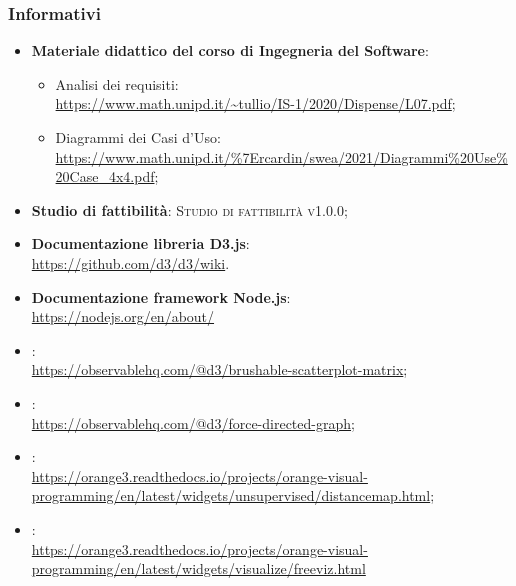 \documentclass[../analisi_dei_requisiti.tex]{subfiles}
\begin{document}
\subsubsection{Informativi}%
\label{ssub:informativi}
\begin{itemize}
  \item \textbf{Materiale didattico del corso di Ingegneria del Software}:
        \begin{itemize}
          \item Analisi dei requisiti: \\
                \url{https://www.math.unipd.it/~tullio/IS-1/2020/Dispense/L07.pdf};
          \item Diagrammi dei Casi d'Uso: \\
                \url{https://www.math.unipd.it/%7Ercardin/swea/2021/Diagrammi%20Use%20Case_4x4.pdf};
        \end{itemize}
  \item \textbf{Studio di fattibilità}: \textsc{Studio di fattibilità v1.0.0};

  \item \textbf{Documentazione libreria D3.js}: \\
        \url{https://github.com/d3/d3/wiki}.

  \item \textbf{Documentazione framework Node.js}: \\
        \url{https://nodejs.org/en/about/}

  \item {}: \\
        \url{https://observablehq.com/@d3/brushable-scatterplot-matrix};

  \item {}: \\
        \url{https://observablehq.com/@d3/force-directed-graph};

  \item {}: \\
        \url{https://orange3.readthedocs.io/projects/orange-visual-programming/en/latest/widgets/unsupervised/distancemap.html};

  \item {}: \\
        \url{https://orange3.readthedocs.io/projects/orange-visual-programming/en/latest/widgets/visualize/freeviz.html}
\end{itemize}
\end{document}
